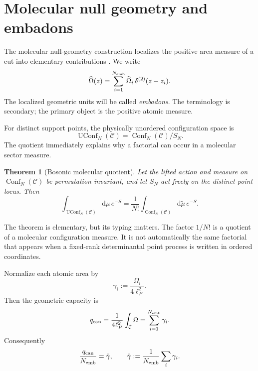 \documentclass[aps,prd,preprint,nofootinbib,superscriptaddress]{revtex4-2}
\newtheorem{theorem}{Theorem}[section]
\theoremstyle{definition}
\theoremstyle{remark}
\newcommand{\dd}{\mathrm d}
\newcommand{\Conf}{\operatorname{Conf}}
\newcommand{\UConf}{\operatorname{UConf}}
\begin{document}
\section{Molecular null geometry and embadons}
\label{sec:embadon}

The molecular null-geometry construction localizes the positive area measure of a cut into elementary contributions \cite{CiambelliFreidelLeigh2024}.  We write
\begin{equation}
\widehat\Omega(z)
=
\sum_{i=1}^{N_{\rm emb}}
\widehat\Omega_i\,
\delta^{(2)}(z-z_i).
\label{eq:embadonmeasure}
\end{equation}
The localized geometric units will be called \emph{embadons}.  The terminology is secondary; the primary object is the positive atomic measure.

For distinct support points, the physically unordered configuration space is
\begin{equation}
\UConf_N(\mathcal C)
=
\Conf_N(\mathcal C)/S_N.
\label{eq:uconf}
\end{equation}
The quotient immediately explains why a factorial can occur in a molecular sector measure.

\begin{theorem}[Bosonic molecular quotient]
\label{thm:bosonicquotient}
Let the lifted action and measure on $\Conf_N(\mathcal C)$ be permutation invariant, and let $S_N$ act freely on the distinct-point locus.  Then
\begin{equation}
\int_{\UConf_N(\mathcal C)}
\dd\mu\,e^{-S}
=
\frac1{N!}
\int_{\Conf_N(\mathcal C)}
\dd\widetilde\mu\,e^{-S}.
\label{eq:bosonicquotient}
\end{equation}
\end{theorem}

The theorem is elementary, but its typing matters.  The factor $1/N!$ is a quotient of a molecular configuration measure.  It is not automatically the same factorial that appears when a fixed-rank determinantal point process is written in ordered coordinates.

Normalize each atomic area by
\begin{equation}
\gamma_i:=\frac{\Omega_i}{4\ell_P^2}.
\label{eq:gamma}
\end{equation}
Then the geometric capacity is
\begin{equation}
q_{\rm can}
=
\frac1{4\ell_P^2}\int_{\mathcal C}\Omega
=
\sum_{i=1}^{N_{\rm emb}}\gamma_i.
\label{eq:weightedcapacity}
\end{equation}
Consequently
\begin{equation}
\frac{q_{\rm can}}{N_{\rm emb}}
=
\bar\gamma,
\qquad
\bar\gamma:=\frac1{N_{\rm emb}}\sum_i\gamma_i.
\label{eq:avgweight}
\end{equation}
\end{document}
